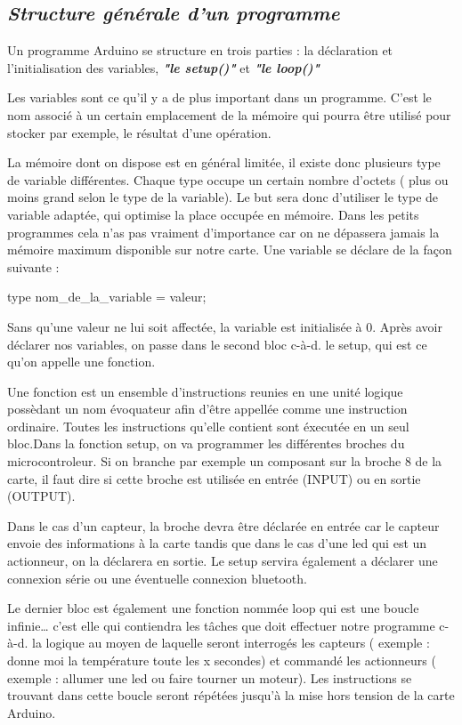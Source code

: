 \documentclass[12pt,a4paper]{article}
\begin{document}
\subsection{\textit{\textbf{Structure générale d’un programme}}}

Un programme Arduino se structure en trois parties :
la déclaration et l’initialisation des variables, \textit{\textbf{"le setup()"}} et \textit{\textbf{"le loop()"}}

\bigskip

Les variables sont ce qu’il y a de plus important dans un programme. C’est le nom associé à un certain emplacement de la mémoire qui pourra être utilisé pour stocker par exemple, le résultat d’une opération.

\bigskip

La mémoire dont on dispose est en général limitée, il existe donc plusieurs type de variable différentes. Chaque type occupe un certain nombre d’octets ( plus ou moins grand selon le type de la variable).  Le but sera donc d’utiliser le type de variable adaptée, qui optimise la place occupée en mémoire. Dans les petits programmes cela n’as pas vraiment d’importance car on ne dépassera jamais la mémoire maximum disponible sur notre carte. Une variable se déclare de la façon suivante :
\begin{center}
type nom\_de\_la\_variable = valeur; 
\end{center}
Sans qu’une valeur ne lui soit affectée, la variable est initialisée à 0. Après avoir déclarer nos variables, on passe dans le second bloc c-à-d. le setup, qui est ce qu’on appelle une fonction. 

\bigskip

Une fonction est un ensemble d’instructions reunies en une unité logique possèdant un nom évoquateur afin d’être appellée comme une instruction ordinaire. Toutes les instructions qu’elle contient sont éxecutée en un seul bloc.Dans la fonction setup, on va programmer les différentes broches du microcontroleur. Si on branche par exemple un composant sur la broche 8 de la carte, il faut dire si cette broche est utilisée en entrée (INPUT) ou en sortie (OUTPUT).

Dans le cas d’un capteur, la broche devra être déclarée en entrée car le capteur envoie des informations à la carte tandis que dans le cas d’une led qui est un actionneur, on la déclarera en sortie. Le setup servira également a déclarer une connexion série ou une éventuelle connexion bluetooth.

\bigskip
Le dernier bloc est également une fonction nommée loop qui est une boucle infinie…
c’est elle qui contiendra les tâches que doit effectuer notre programme c-à-d. la logique au moyen de laquelle seront interrogés les capteurs 
( exemple : donne moi la température toute les x secondes) et commandé les actionneurs ( exemple : allumer une led ou faire tourner un moteur). Les instructions se trouvant dans cette boucle seront répétées jusqu’à la mise hors tension de la carte Arduino.
\end{document}
